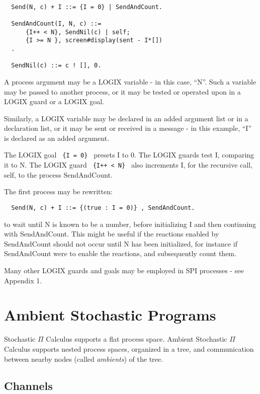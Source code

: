 \begin{verbatim}

  Send(N, c) + I ::= {I = 0} | SendAndCount.

  SendAndCount(I, N, c) ::=
      {I++ < N}, SendNil(c) | self;
      {I >= N }, screen#display(sent - I*[])
  .

  SendNil(c) ::= c ! [], 0.
\end{verbatim}

\noindent
A process argument may be a LOGIX variable - in this case, ``N''.
Such a variable may be passed to another process, or it may be
tested or operated upon in a LOGIX guard or a LOGIX goal.

\noindent
Similarly, a LOGIX variable may be declared in an added argument
list or in a declaration list, or it may be sent or
received in a message - in this example, ``I'' is declared
as an added argument.

\noindent
The LOGIX goal \verb+ {I = 0} + presets I to 0.
\noindent
The LOGIX guards test I, comparing it to N.
The LOGIX guard \verb# {I++ < N} # also increments I, for the
recursive call, self, to the process SendAndCount.

\noindent
The first process may be rewritten:

\begin{verbatim}
  Send(N, c) + I ::= {(true : I = 0)} , SendAndCount.
\end{verbatim}

\noindent
to wait until N is known to be a number, before initializing
I and then continuing with SendAndCount.  This might be useful
if the reactions enabled by SendAndCount should not occur
until N has been initialized, for instance if SendAndCount
were to enable the reactions, and subsequently count them.
\newline

\noindent
Many other LOGIX guards and goals may be employed in SPI processes -
see \cite{logix:user-man} Appendix 1.

\chapter{Ambient Stochastic Programs}
\label{aspic}

Stochastic $\Pi$ Calculus supports a flat process space.  Ambient
Stochastic $\Pi$ Calculus supports nested process spaces,
organized in a tree, and
communication between nearby nodes (called {\em ambients}) of the tree.

\section{Channels}

